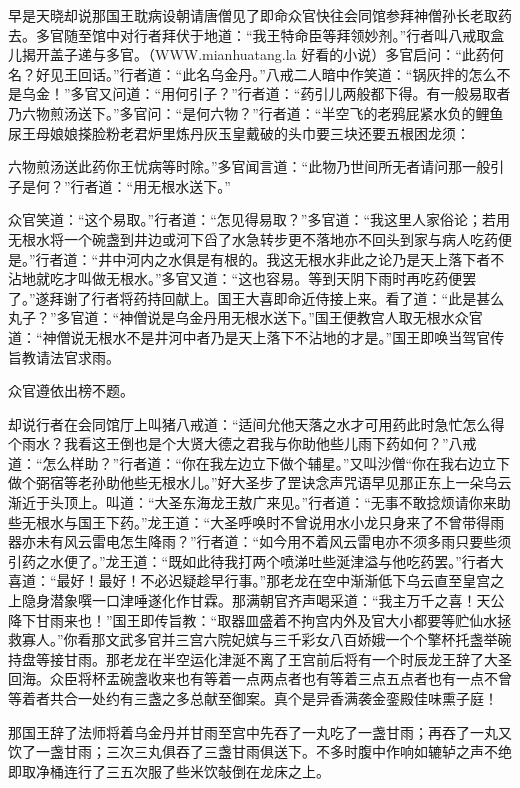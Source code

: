 \documentclass[12pt,UTF8]{ctexbook}
\begin{document}
早是天晓却说那国王耽病设朝请唐僧见了即命众官快往会同馆参拜神僧孙长老取药去。多官随至馆中对行者拜伏于地道：“我王特命臣等拜领妙剂。”行者叫八戒取盒儿揭开盖子递与多官。（WWW.mianhuatang.la 好看的小说）多官启问：“此药何名？好见王回话。”行者道：“此名乌金丹。”八戒二人暗中作笑道：“锅灰拌的怎么不是乌金！”多官又问道：“用何引子？”行者道：“药引儿两般都下得。有一般易取者乃六物煎汤送下。”多官问：“是何六物？”行者道：“半空飞的老鸦屁紧水负的鲤鱼尿王母娘娘搽脸粉老君炉里炼丹灰玉皇戴破的头巾要三块还要五根困龙须：

六物煎汤送此药你王忧病等时除。”多官闻言道：“此物乃世间所无者请问那一般引子是何？”行者道：“用无根水送下。”

众官笑道：“这个易取。”行者道：“怎见得易取？”多官道：“我这里人家俗论；若用无根水将一个碗盏到井边或河下舀了水急转步更不落地亦不回头到家与病人吃药便是。”行者道：“井中河内之水俱是有根的。我这无根水非此之论乃是天上落下者不沾地就吃才叫做无根水。”多官又道：“这也容易。等到天阴下雨时再吃药便罢了。”遂拜谢了行者将药持回献上。国王大喜即命近侍接上来。看了道：“此是甚么丸子？”多官道：“神僧说是乌金丹用无根水送下。”国王便教宫人取无根水众官道：“神僧说无根水不是井河中者乃是天上落下不沾地的才是。”国王即唤当驾官传旨教请法官求雨。

众官遵依出榜不题。

却说行者在会同馆厅上叫猪八戒道：“适间允他天落之水才可用药此时急忙怎么得个雨水？我看这王倒也是个大贤大德之君我与你助他些儿雨下药如何？”八戒道：“怎么样助？”行者道：“你在我左边立下做个辅星。”又叫沙僧“你在我右边立下做个弼宿等老孙助他些无根水儿。”好大圣步了罡诀念声咒语早见那正东上一朵乌云渐近于头顶上。叫道：“大圣东海龙王敖广来见。”行者道：“无事不敢捻烦请你来助些无根水与国王下药。”龙王道：“大圣呼唤时不曾说用水小龙只身来了不曾带得雨器亦未有风云雷电怎生降雨？”行者道：“如今用不着风云雷电亦不须多雨只要些须引药之水便了。”龙王道：“既如此待我打两个喷涕吐些涎津溢与他吃药罢。”行者大喜道：“最好！最好！不必迟疑趁早行事。”那老龙在空中渐渐低下乌云直至皇宫之上隐身潜象噀一口津唾遂化作甘霖。那满朝官齐声喝采道：“我主万千之喜！天公降下甘雨来也！”国王即传旨教：“取器皿盛着不拘宫内外及官大小都要等贮仙水拯救寡人。”你看那文武多官并三宫六院妃嫔与三千彩女八百娇娥一个个擎杯托盏举碗持盘等接甘雨。那老龙在半空运化津涎不离了王宫前后将有一个时辰龙王辞了大圣回海。众臣将杯盂碗盏收来也有等着一点两点者也有等着三点五点者也有一点不曾等着者共合一处约有三盏之多总献至御案。真个是异香满袭金銮殿佳味熏子庭！

那国王辞了法师将着乌金丹并甘雨至宫中先吞了一丸吃了一盏甘雨；再吞了一丸又饮了一盏甘雨；三次三丸俱吞了三盏甘雨俱送下。不多时腹中作响如辘轳之声不绝即取净桶连行了三五次服了些米饮敧倒在龙床之上。
\end{document}

